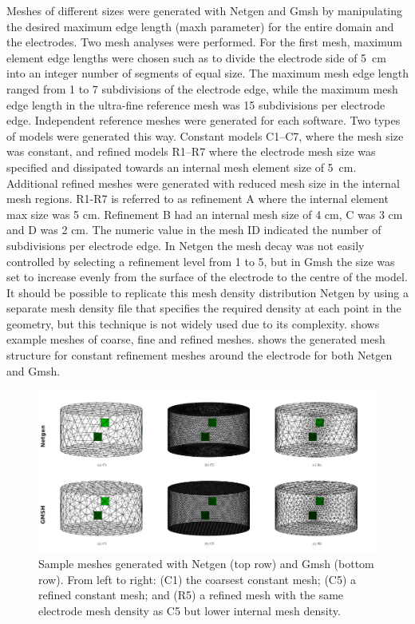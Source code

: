 Meshes of different sizes were generated with Netgen and Gmsh by manipulating the desired
maximum edge length (maxh parameter) for the entire domain and the electrodes.
Two  mesh analyses were performed. For the first
mesh, maximum element edge lengths were
chosen such as to divide the electrode side of 5~cm into an integer number of
segments of equal size. 
The maximum mesh edge length ranged from 1 to 7 subdivisions of the electrode 
edge, while the maximum mesh edge length in the ultra-fine reference mesh  
was 15 subdivisions per 
electrode edge. Independent reference meshes were generated for each software.
Two types of models were generated this way. Constant models C1--C7, where the mesh size 
was constant, and refined models R1--R7 where the electrode mesh size was specified and 
dissipated towards an internal mesh element size of 5 cm. Additional refined meshes were
generated with reduced mesh size in the internal mesh regions.  
R1-R7 is referred to as refinement A where the internal element max size was 5 cm. Refinement 
B had an internal mesh size of 4 cm, C was 3 cm and D was 2 cm.
The numeric value in the mesh 
ID indicated the number of subdivisions per electrode edge. 
In Netgen the mesh decay was not easily controlled by selecting a refinement 
level from 1 to 5, but in Gmsh the size was set 
to increase evenly from the surface of the electrode to the centre of the model.
It should be possible to replicate this mesh density distribution Netgen by using a 
separate mesh density file that specifies the required density at each point in the geometry,
but this technique is not widely used due to its complexity.
 shows example meshes of coarse, fine and refined
meshes.  shows the generated mesh structure for 
constant refinement meshes around the electrode 
for both Netgen and Gmsh. 


\begin{figure}[H]
   \includegraphics[width=\columnwidth]{chapter4-mesh_refinement/imgs/sample_meshes.pdf}
   \caption[Example meshes for various refinement strategies]{\label{fig:sample_meshes} 
   Sample meshes generated with Netgen (top row)
   and Gmsh (bottom row). From left to right: (C1) the coarsest constant
   mesh; (C5) a refined constant mesh; and (R5) a refined mesh with the same
   electrode mesh density as C5 but lower internal mesh density.}
\end{figure}

